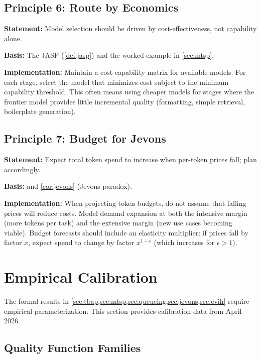 \documentclass[11pt, a4paper, logo, copyright]{googledeepmind}
\begin{document}
\subsection{Principle 6: Route by Economics}

\textbf{Statement:} Model selection should be driven by cost-effectiveness, not capability alone.

\textbf{Basis:} The JASP (\cref{def:jasp}) and the worked example in \cref{sec:mtsp}.

\textbf{Implementation:} Maintain a cost-capability matrix for available models. For each stage, select the model that minimizes cost subject to the minimum capability threshold. This often means using cheaper models for stages where the frontier model provides little incremental quality (formatting, simple retrieval, boilerplate generation).

\subsection{Principle 7: Budget for Jevons}

\textbf{Statement:} Expect total token spend to increase when per-token prices fall; plan accordingly.

\textbf{Basis:}  and \cref{cor:jevons} (Jevons paradox).

\textbf{Implementation:} When projecting token budgets, do not assume that falling prices will reduce costs. Model demand expansion at both the intensive margin (more tokens per task) and the extensive margin (new use cases becoming viable). Budget forecasts should include an elasticity multiplier: if prices fall by factor $x$, expect spend to change by factor $x^{1-\epsilon}$ (which increases for $\epsilon > 1$).


\section{Empirical Calibration}\label{sec:calibration}

The formal results in \cref{sec:tbap,sec:mtsp,sec:queueing,sec:jevons,sec:cvih} require empirical parameterization. This section provides calibration data from April 2026.

\subsection{Quality Function Families}
\end{document}
